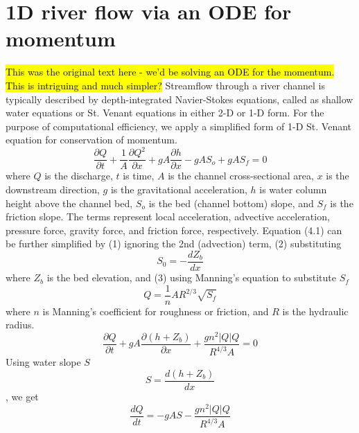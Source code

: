 \documentclass[twoside,10pt]{report}
\begin{document}
\section{1D river flow via an ODE for momentum}
\hl{This was the original text here - we'd be solving an ODE for the momentum. This is intriguing and much simpler?}
Streamflow through a river channel is typically described by depth-integrated Navier-Stokes equations, called as shallow water equations or St. Venant equations in either 2-D or 1-D form. For the purpose of computational efficiency, we apply a simplified form of 1-D St. Venant equation for conservation of momentum. 
\begin{equation}
    \frac{\partial Q}{\partial t}+ \frac{1}{A}\frac{\partial Q^2}{\partial x} + gA\frac{\partial h}{\partial x} -gAS_o + gAS_f = 0
\end{equation}
where $Q$ is the discharge, $t$ is time, $A$ is the channel cross-sectional area, $x$ is the downstream direction, $g$ is the gravitational acceleration, $h$ is water column height above the channel bed, $S_o$ is the bed (channel bottom) slope, and $S_f$ is the friction slope. The terms represent local acceleration, advective acceleration, pressure force, gravity force, and friction force, respectively. Equation (4.1) can be further simplified by (1) ignoring the 2nd (advection) term, (2) substituting 
\begin{equation}
    S_0 = -\frac{dZ_b}{dx}
\end{equation}
where $Z_b$ is the bed elevation, and (3) using Manning's equation to substitute $S_f$
\begin{equation}
    Q = \frac{1}{n}AR^{2/3}\sqrt{S_f}
\end{equation}
where $n$ is Manning's coefficient for roughness or friction, and $R$ is the hydraulic radius.  
\begin{equation}
    \frac{\partial Q}{\partial t} + gA\dfrac{\partial (h + Z_b)}{\partial x} + \frac{gn^2|Q|Q}{R^{4/3}A} = 0
\end{equation}
Using water slope $S$ \begin{equation}
    S = \dfrac{d(h + Z_b)}{dx}
\end{equation}
, we get 
\begin{equation}
    \frac{dQ}{dt} = - gAS - \frac{gn^2|Q|Q}{R^{4/3}A}
\end{equation}
\end{document}
